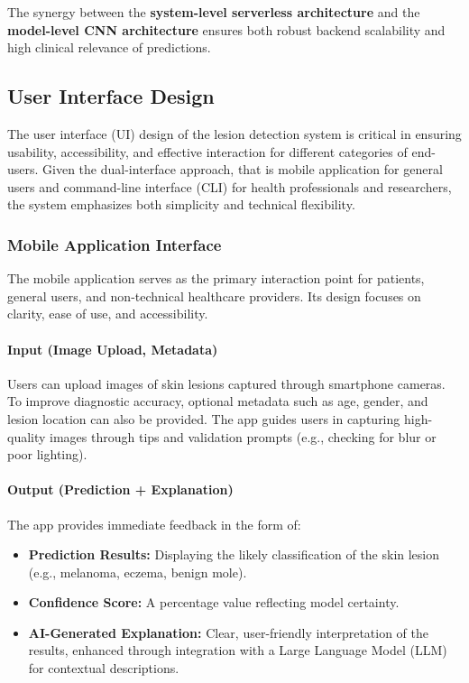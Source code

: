 \documentclass[
  12pt,
  oneside]{article}
\providecommand{\tightlist}{%
  \setlength{\itemsep}{0pt}\setlength{\parskip}{0pt}}
\begin{document}
The synergy between the \textbf{system-level serverless architecture}
and the \textbf{model-level CNN architecture} ensures both robust
backend scalability and high clinical relevance of predictions.

\subsection{User Interface Design}\label{user-interface-design}

The user interface (UI) design of the lesion detection system is
critical in ensuring usability, accessibility, and effective interaction
for different categories of end-users. Given the dual-interface
approach, that is mobile application for general users and command-line
interface (CLI) for health professionals and researchers, the system
emphasizes both simplicity and technical flexibility.

\subsubsection{Mobile Application
Interface}\label{mobile-application-interface}

The mobile application serves as the primary interaction point for
patients, general users, and non-technical healthcare providers. Its
design focuses on clarity, ease of use, and accessibility.

\paragraph{Input (Image Upload,
Metadata)}\label{input-image-upload-metadata}

Users can upload images of skin lesions captured through smartphone
cameras. To improve diagnostic accuracy, optional metadata such as age,
gender, and lesion location can also be provided. The app guides users
in capturing high-quality images through tips and validation prompts
(e.g., checking for blur or poor lighting).

\paragraph{Output (Prediction +
Explanation)}\label{output-prediction-explanation}

The app provides immediate feedback in the form of:

\begin{itemize}
\tightlist
\item
  \textbf{Prediction Results:} Displaying the likely classification of
  the skin lesion (e.g., melanoma, eczema, benign mole).\\
\item
  \textbf{Confidence Score:} A percentage value reflecting model
  certainty.\\
\item
  \textbf{AI-Generated Explanation:} Clear, user-friendly interpretation
  of the results, enhanced through integration with a Large Language
  Model (LLM) for contextual descriptions.
\end{itemize}
\end{document}
